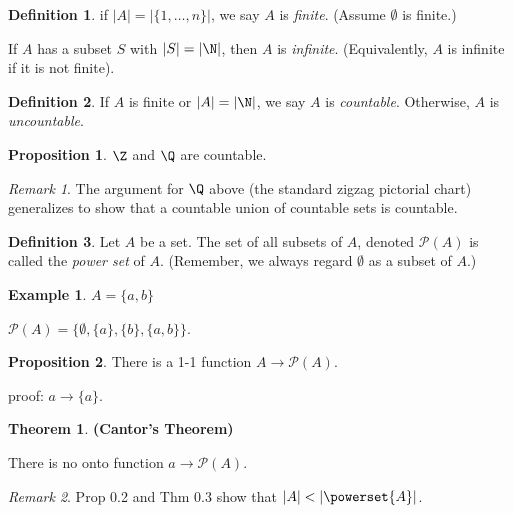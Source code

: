 \documentclass[a5paper]{article}
\theoremstyle{definition}%
\newtheorem*{theorem*}{Theorem} %
\newtheorem*{proposition*}{Proposition}
\newtheorem*{definition*}{Definition}
\newtheorem*{example*}{Example}
\numberwithin{exercise}{section}
\theoremstyle{remark}%
\newtheorem*{remark*}{Remark}
\begin{document}
\begin{definition*}
if $|A| = |\{1, \ldots , n\}|$, we say $A$ is \emph{finite}. (Assume $\emptyset$ is finite.)

If $A$ has a subset $S$ with $|S| = |\N|$, then $A$ is \emph{infinite}. (Equivalently, $A$ is infinite if it is not finite). 
\end{definition*}

\begin{definition*}
If $A$ is finite or $|A| = |\N|$, we say $A$ is \emph{countable}. Otherwise, $A$ is \emph{uncountable}.
\end{definition*}

\begin{proposition*}
$\Z$ and $\Q$ are countable. 
\end{proposition*}

\begin{remark*}
The argument for $\Q$ above (the standard zigzag pictorial chart) generalizes to show that a countable union of countable sets is countable. 
\end{remark*}

\begin{definition*}
Let $A$ be a set. The set of all subsets of $A$, denoted $\mathcal{P}(A)$ is called the \emph{power set} of $A$. (Remember, we always regard $\emptyset$ as a subset of $A$.)
\end{definition*}

\begin{example*}
$A = \{a,b\}$

$\mathcal{P}(A) = \{ \emptyset, \{a\}, \{b\}, \{a,b\} \}$.
\end{example*}

\begin{proposition*}
There is a 1-1 function $A \to \mathcal{P}(A)$.

proof: $a \to \{a\}$.
\end{proposition*}

\begin{theorem*}\textbf{(Cantor's Theorem)}

There is no onto function $a \to \mathcal{P}(A).$
\end{theorem*}

\begin{remark*}
Prop 0.2 and Thm 0.3 show that $|A| < |\powerset{A}|$.
\end{remark*}
\end{document}
